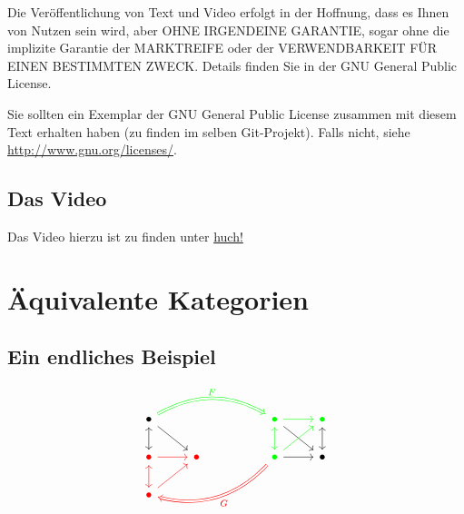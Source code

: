 \documentclass[a4paper]{amsart}
\theoremstyle{definition}
\begin{document}
Die Veröffentlichung von Text und Video erfolgt in der Hoffnung, dass es Ihnen von Nutzen sein wird, 
aber OHNE IRGENDEINE GARANTIE, sogar ohne die implizite Garantie der MARKTREIFE oder der 
VERWENDBARKEIT FÜR EINEN BESTIMMTEN ZWECK. Details finden Sie in der GNU General Public License.

Sie sollten ein Exemplar der GNU General Public License zusammen mit diesem Text erhalten haben 
(zu finden im selben Git-Projekt). 
Falls nicht, siehe \url{http://www.gnu.org/licenses/}.

\subsection*{Das Video}
Das Video hierzu ist zu finden unter 
{\tiny
   \url{huch!}
}

\section{Äquivalente Kategorien}

\subsection{Ein endliches Beispiel}
\begin{equation}
	\begin{tikzcd}
		\bullet \arrow[leftrightarrow,d] \arrow[dr] \arrow[Rightarrow,rrr, bend left, green, "F"]&&& 
		   \color{green}\bullet \arrow[leftrightarrow,green,d] \arrow[green,r] \arrow[dr] & \color{green}\bullet \arrow[leftrightarrow,d]\\
		\color{red}\bullet \arrow[leftrightarrow,red,d] \arrow[red,r] & \color{red}\bullet && 
		   \color{green}\bullet                          \arrow[r] \arrow[green,ur] \arrow[Rightarrow,red,llld, bend left, "G"] & \bullet \\
		\color{red}\bullet           \arrow[red,ur]
	\end{tikzcd}
\end{equation}
\end{document}
